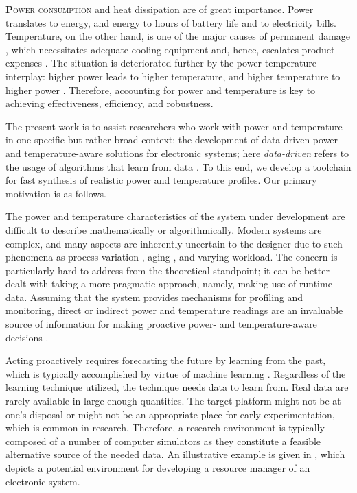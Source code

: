 \lettrine[findent=0.3em, nindent=0em]{\textbf{P}}{ower consumption} and heat
dissipation are of great importance. Power translates to energy, and energy to
hours of battery life and to electricity bills. Temperature, on the other hand,
is one of the major causes of permanent damage \cite{jedec}, which necessitates
adequate cooling equipment and, hence, escalates product expenses
\cite{chaudhry2015}. The situation is deteriorated further by the
power-temperature interplay: higher power leads to higher temperature, and
higher temperature to higher power \cite{liu2007}. Therefore, accounting for
power and temperature is key to achieving effectiveness, efficiency, and
robustness.

The present work is to assist researchers who work with power and temperature in
one specific but rather broad context: the development of data-driven power- and
temperature-aware solutions for electronic systems; here \emph{data-driven}
refers to the usage of algorithms that learn from data \cite{bishop2006}. To
this end, we develop a toolchain for fast synthesis of realistic power and
temperature profiles. Our primary motivation is as follows.

The power and temperature characteristics of the system under development are
difficult to describe mathematically or algorithmically. Modern systems are
complex, and many aspects are inherently uncertain to the designer due to such
phenomena as process variation \cite{chandrakasan2000}, aging \cite{coskun2006},
and varying workload. The concern is particularly hard to address from the
theoretical standpoint; it can be better dealt with taking a more pragmatic
approach, namely, making use of runtime data. Assuming that the system provides
mechanisms for profiling and monitoring, direct or indirect power and
temperature readings are an invaluable source of information for making
proactive power- and temperature-aware decisions \cite{chaudhry2015,
coskun2008}.


Acting proactively requires forecasting the future by learning from the past,
which is typically accomplished by virtue of machine learning \cite{bishop2006}.
Regardless of the learning technique utilized, the technique needs data to learn
from. Real data are rarely available in large enough quantities. The target
platform might not be at one's disposal or might not be an appropriate place for
early experimentation, which is common in research. Therefore, a research
environment is typically composed of a number of computer simulators as they
constitute a feasible alternative source of the needed data. An illustrative
example is given in , which depicts a potential environment
for developing a resource manager of an electronic system.

